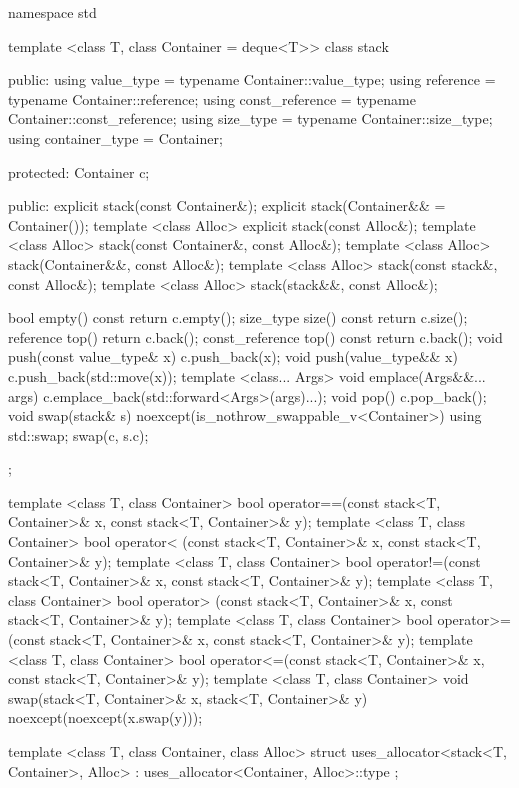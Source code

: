 \begin{codeblock}
namespace std {
  template <class T, class Container = deque<T>>
  class stack {
  public:
    using value_type      = typename Container::value_type;
    using reference       = typename Container::reference;
    using const_reference = typename Container::const_reference;
    using size_type       = typename Container::size_type;
    using container_type  = Container;

  protected:
    Container c;

  public:
    explicit stack(const Container&);
    explicit stack(Container&& = Container());
    template <class Alloc> explicit stack(const Alloc&);
    template <class Alloc> stack(const Container&, const Alloc&);
    template <class Alloc> stack(Container&&, const Alloc&);
    template <class Alloc> stack(const stack&, const Alloc&);
    template <class Alloc> stack(stack&&, const Alloc&);

    bool      empty() const             { return c.empty(); }
    size_type size()  const             { return c.size(); }
    reference         top()             { return c.back(); }
    const_reference   top() const       { return c.back(); }
    void push(const value_type& x)      { c.push_back(x); }
    void push(value_type&& x)           { c.push_back(std::move(x)); }
    template <class... Args>
      void emplace(Args&&... args)      { c.emplace_back(std::forward<Args>(args)...); }
    void pop()                          { c.pop_back(); }
    void swap(stack& s) noexcept(is_nothrow_swappable_v<Container>)
      { using std::swap; swap(c, s.c); }
  };

  template <class T, class Container>
    bool operator==(const stack<T, Container>& x, const stack<T, Container>& y);
  template <class T, class Container>
    bool operator< (const stack<T, Container>& x, const stack<T, Container>& y);
  template <class T, class Container>
    bool operator!=(const stack<T, Container>& x, const stack<T, Container>& y);
  template <class T, class Container>
    bool operator> (const stack<T, Container>& x, const stack<T, Container>& y);
  template <class T, class Container>
    bool operator>=(const stack<T, Container>& x, const stack<T, Container>& y);
  template <class T, class Container>
    bool operator<=(const stack<T, Container>& x, const stack<T, Container>& y);
  template <class T, class Container>
    void swap(stack<T, Container>& x, stack<T, Container>& y) noexcept(noexcept(x.swap(y)));

  template <class T, class Container, class Alloc>
    struct uses_allocator<stack<T, Container>, Alloc>
      : uses_allocator<Container, Alloc>::type { };
}
\end{codeblock}


